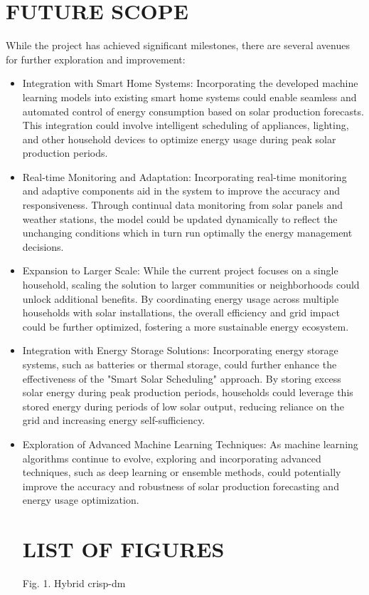 \documentclass[conference]{IEEEtran}
\begin{document}
\section{FUTURE SCOPE}
While the project has achieved significant milestones, there are several avenues for further exploration and improvement:
\begin{itemize}
\item Integration with Smart Home Systems: Incorporating the developed machine learning models into existing smart home systems could enable seamless and automated control of energy consumption based on solar production forecasts. This integration could involve intelligent scheduling of appliances, lighting, and other household devices to optimize energy usage during peak solar production periods.
\item Real-time Monitoring and Adaptation: Incorporating real-time monitoring and adaptive components aid in the system to improve the accuracy and responsiveness. Through continual data monitoring from solar panels and weather stations, the model could be updated dynamically to reflect the unchanging conditions which in turn run optimally the energy management decisions.
\item  Expansion to Larger Scale: While the current project focuses on a single household, scaling the solution to larger communities or neighborhoods could unlock additional benefits. By coordinating energy usage across multiple households with solar installations, the overall efficiency and grid impact could be further optimized, fostering a more sustainable energy ecosystem.
\item Integration with Energy Storage Solutions: Incorporating energy storage systems, such as batteries or thermal storage, could further enhance the effectiveness of the "Smart Solar Scheduling" approach. By storing excess solar energy during peak production periods, households could leverage this stored energy during periods of low solar output, reducing reliance on the grid and increasing energy self-sufficiency.
\item Exploration of Advanced Machine Learning Techniques: As machine learning algorithms continue to evolve, exploring and incorporating advanced techniques, such as deep learning or ensemble methods, could potentially improve the accuracy and robustness of solar production forecasting and energy usage optimization.
\section{LIST OF FIGURES}
Fig. 1. Hybrid crisp-dm


\end{itemize}
\end{document}
